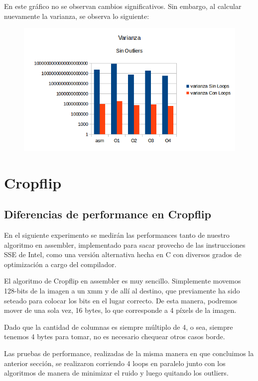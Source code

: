 \documentclass[a4paper]{article}
\begin{document}
En este gráfico no se observan cambios significativos. Sin embargo, al calcular nuevamente la varianza, se observa lo siguiente:

\begin{figure}[h!]
  \begin{center}
	\includegraphics[scale=0.66]{Graficos1.4/1.3/VSO.png}
	\label{nombreparareferenciar4}
  \end{center}
\end{figure}


\newpage
\section{Cropflip}
\subsection{Diferencias de performance en Cropflip}
En el siguiente experimento se medirán las performances tanto de nuestro algoritmo en assembler, implementado para sacar provecho de las instrucciones SSE de Intel, como una versión alternativa hecha en C con diversos grados de optimización a cargo del compilador.

El algoritmo de Cropflip en assembler es muy sencillo. Simplemente movemos 128-bits de la imagen a un xmm y de allí al destino, que previamente ha sido seteado para colocar los bits en el lugar correcto. De esta manera, podremos mover de una sola vez, 16 bytes, lo que corresponde a 4 píxels de la imagen.

Dado que la cantidad de columnas es siempre múltiplo de 4, o sea, siempre tenemos 4 bytes para tomar, no es necesario chequear otros casos borde.

Las pruebas de performance, realizadas de la misma manera en que concluimos la anterior sección, se realizaron corriendo 4 loops en paralelo junto con los algoritmos de manera de minimizar el ruido y luego quitando los outliers.
\end{document}
